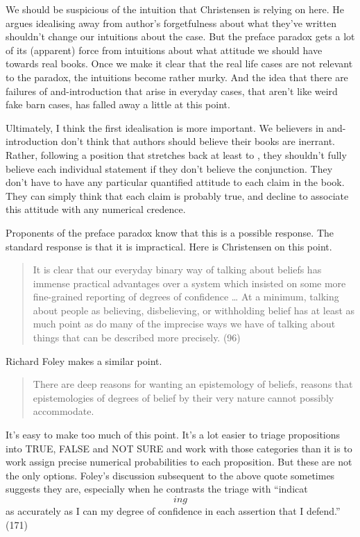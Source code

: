 \documentclass[11pt,]{book}
\begin{document}
We should be suspicious of the intuition that Christensen is relying on here. He argues idealising away from author's forgetfulness about what they've written shouldn't change our intuitions about the case. But the preface paradox gets a lot of its (apparent) force from intuitions about what attitude we should have towards real books. Once we make it clear that the real life cases are not relevant to the paradox, the intuitions become rather murky. And the idea that there are failures of and-introduction that arise in everyday cases, that aren't like weird fake barn cases, has falled away a little at this point.

Ultimately, I think the first idealisation is more important. We believers in and-introduction don't think that authors should believe their books are inerrant. Rather, following a position that stretches back at least to \citet{Stalnaker1984}, they shouldn't fully believe each individual statement if they don't believe the conjunction. They don't have to have any particular quantified attitude to each claim in the book. They can simply think that each claim is probably true, and decline to associate this attitude with any numerical credence.

Proponents of the preface paradox know that this is a possible response. The standard response is that it is impractical. Here is Christensen on this point.

\begin{quote}
It is clear that our everyday binary way of talking about beliefs has immense practical advantages over a system which insisted on some more fine-grained reporting of degrees of confidence \ldots{} At a minimum, talking about people as believing, disbelieving, or withholding belief has at least as much point as do many of the imprecise ways we have of talking about things that can be described more precisely. (96)
\end{quote}

Richard Foley makes a similar point.

\begin{quote}
There are deep reasons for wanting an epistemology of beliefs, reasons that epistemologies of degrees of belief by their very nature cannot possibly accommodate. \citep[ 170, my emphasis]{Foley1993}
\end{quote}

It's easy to make too much of this point. It's a lot easier to triage propositions into TRUE, FALSE and NOT SURE and work with those categories than it is to work assign precise numerical probabilities to each proposition. But these are not the only options. Foley's discussion subsequent to the above quote sometimes suggests they are, especially when he contrasts the triage with ``indicat\[ing\] as accurately as I can my degree of confidence in each assertion that I defend.'' (171)
\end{document}
